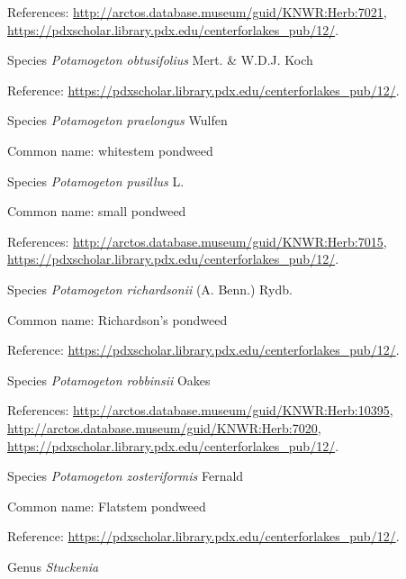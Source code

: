 \documentclass[9pt, article]{memoir}
\begin{document}
\begin{multicols}{2}
References: 
\url{http://arctos.database.museum/guid/KNWR:Herb:7021}, 
\url{https://pdxscholar.library.pdx.edu/centerforlakes_pub/12/}.

\vspace{6pt}\noindent\hspace{36pt}Species \textit{Potamogeton obtusifolius} Mert. \& W.D.J. Koch


Reference: 
\url{https://pdxscholar.library.pdx.edu/centerforlakes_pub/12/}.

\vspace{6pt}\noindent\hspace{36pt}Species \textit{Potamogeton praelongus} Wulfen


Common name: whitestem pondweed

\vspace{6pt}\noindent\hspace{36pt}Species \textit{Potamogeton pusillus} L.


Common name: small pondweed

References: 
\url{http://arctos.database.museum/guid/KNWR:Herb:7015}, 
\url{https://pdxscholar.library.pdx.edu/centerforlakes_pub/12/}.

\vspace{6pt}\noindent\hspace{36pt}Species \textit{Potamogeton richardsonii} (A. Benn.) Rydb.


Common name: Richardson's pondweed

Reference: 
\url{https://pdxscholar.library.pdx.edu/centerforlakes_pub/12/}.

\vspace{6pt}\noindent\hspace{36pt}Species \textit{Potamogeton robbinsii} Oakes


References: 
\url{http://arctos.database.museum/guid/KNWR:Herb:10395}, 
\url{http://arctos.database.museum/guid/KNWR:Herb:7020}, 
\url{https://pdxscholar.library.pdx.edu/centerforlakes_pub/12/}.

\vspace{6pt}\noindent\hspace{36pt}Species \textit{Potamogeton zosteriformis} Fernald


Common name: Flatstem pondweed

Reference: 
\url{https://pdxscholar.library.pdx.edu/centerforlakes_pub/12/}.

\vspace{6pt}\noindent\hspace{30pt}Genus \textit{Stuckenia}



\end{multicols}
\end{document}
